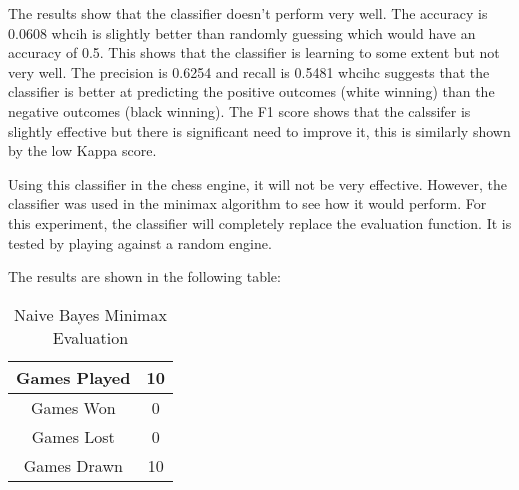 
The results show that the classifier doesn't perform very well. The accuracy is 0.0608 whcih is slightly better than randomly guessing which would have an accuracy of 0.5. This shows that the classifier is learning to some extent but not very well. The precision is 0.6254 and recall is 0.5481 whcihc suggests that the classifier is better at predicting the positive outcomes (white winning) than the negative outcomes (black winning). The F1 score shows that the calssifer is slightly effective but there is significant need to improve it, this is similarly shown by the low Kappa score.

Using this classifier in the chess engine, it will not be very effective. However, the classifier was used in the minimax algorithm to see how it would perform. For this experiment, the classifier will completely replace the evaluation function. It is tested by playing against a random engine. 

The results are shown in the following table:

\begin{table}[H]
    \centering
    \begin{tabular}{|c|c|}
    \hline
    Games Played        & 10           \\ \hline
    Games Won           & 0           \\ \hline
    Games Lost          & 0          \\ \hline
    Games Drawn         & 10           \\ \hline
    \end{tabular}
    \caption{Naive Bayes Minimax Evaluation}
    \label{tab:naive_bayes_minimax_evaluation}
\end{table}



